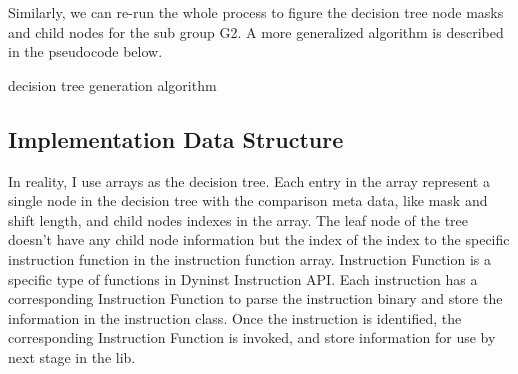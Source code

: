 \documentclass[]{article}
\begin{document}
Similarly, we can re-run the whole process to figure the decision tree node masks and child nodes for the sub group G2. A more generalized algorithm is described in the pseudocode below.

\begin{algorithm}[h]
\caption{decision tree generation algorithm}\label{euclid}
\begin{algorithmic}[1]

		\State \Return 
	\EndIf
	\newline
	
	\EndFor
	\newline
	
	
	\EndFor
	\newline
	
	
	\EndFor
	
	\EndProcedure
\end{algorithmic}	
	
\end{algorithm}


\subsection{Implementation Data Structure}
In reality, I use arrays as the decision tree. Each entry in the array represent a single node in the decision tree with the comparison meta data, like mask and shift length, and child nodes indexes in the array. The leaf node of the tree doesn't have any child node information but the index of the index to the specific instruction function in the instruction function array. Instruction Function is a specific type of functions in Dyninst Instruction API. Each instruction has a corresponding Instruction Function to parse the instruction
binary and store the information in the instruction class. Once the instruction is identified, the corresponding Instruction Function is
invoked, and store information for use by next stage in the lib.
\end{document}

